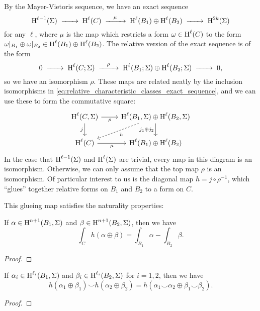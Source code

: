 By the Mayer-Vietoris sequence, we have an exact sequence
\[
	\H^{\ell-1}(\Sigma)\lkxto \H^{\ell}(C) \lkxto[\mu] \H^{\ell}(B_1)\oplus \H^{\ell}(B_2) \lkxto \H^{2k}(\Sigma)
\]
for any $\ell$, where $\mu$ is the map which restricts a form $\omega\in \operatorname{H}^\ell(C)$ to the form $\omega|_{B_1}\oplus \omega|_{B_2}\in \operatorname{H}^{\ell}(B_1)\oplus \operatorname{H}^{\ell}(B_2)$.
The relative version of the exact sequence is of the form
\[
	0 \lkxto \H^{\ell}(C; \Sigma) \lkxto[\rho] \H^{\ell}(B_1;\Sigma)\oplus \H^{\ell}(B_2;\Sigma) \lkxto 0,
\]
so we have an isomorphism $\rho$.
These maps are related neatly by the inclusion isomorphisms in \cref{eq:relative_characteristic_classes_exact_sequence}, and we can use these to form the commutative square:
\begin{equation}\label{eq:closing_coboundaries_square}
	\begin{tikzcd}
		{\H^{\ell}(C,\Sigma)} & {\H^{\ell}(B_1,\Sigma)\oplus\H^{\ell}(B_2,\Sigma)} \\
		{\H^{\ell}(C)} & {\H^{\ell}(B_1)\oplus\H^{\ell}(B_2)}
		\arrow["j_1\oplus j_2"', from=1-2, to=2-2]
		\arrow["\rho"', from=1-1, to=1-2]
		\arrow["j"', from=1-1, to=2-1]
		\arrow["\mu"', from=2-1, to=2-2]
		\arrow["h", from=1-2, to=2-1, dashed]
	\end{tikzcd}
\end{equation}
In the case that $\operatorname{H}^{\ell-1}(\Sigma)$ and $\operatorname{H}^\ell(\Sigma)$ are trivial, every map in this diagram is an isomorphism. Otherwise, we can only assume that the top map $\rho$ is an isomorphism.
Of particular interest to us is the diagonal map $h = j\circ \rho^{-1}$, which ``glues'' together relative forms on $B_1$ and $B_2$ to a form on $C$.

This glueing map satisfies the naturality properties:

\begin{proposition}\label{prop:variation_naturality_poincare}
	If $\alpha\in \operatorname{H}^{n+1}(B_1, \Sigma)$ and $\beta\in \operatorname{H}^{n+1}(B_2,\Sigma)$, then we have
	\[
		\int_C h(\alpha\oplus \beta) = \int_{B_1}\alpha - \int_{B_2}\beta.
	\]
\end{proposition}
\begin{proof}
\end{proof}

\begin{proposition}\label{prop:variation_naturality_cup}
	If
	$\alpha_i\in \operatorname{H}^{\ell_i}(B_1,\Sigma)$ and $\beta_i \in \operatorname{H}^{\ell_i}(B_2,\Sigma)$ for $i=1,2$, then we have
	\[
		h(\alpha_1\oplus\beta_1) \smile h(\alpha_2\oplus \beta_2) = h(\alpha_1\smile \alpha_2 \oplus \beta_1\smile \beta_2).
	\]
\end{proposition}
\begin{proof}
\end{proof}

